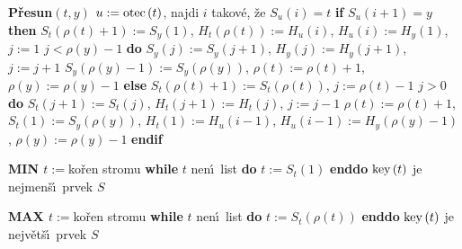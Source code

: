{\bf P\v resun$\left(t,y\right)$\newline 
$u:=\operatorname{otec}\left(t\right)$}, najdi $i$ takov\'e, \v ze $S_u\left(i\right)=t$\newline 
{\bf if} $S_u\left(i+1\right)=y$ {\bf then}\newline 
\phantom{---}$S_t\left(\rho \left(t\right)+1\right):=S_y\left(1\right)$, $H_t\left(\rho \left(t\right)\right):=H_u\left(i\right)$,\newline 
\phantom{---}$H_u\left(i\right):=H_y\left(1\right)$, $j:=1$\newline 
\phantom{---}{\bf while} $j<\rho \left(y\right)-1$ {\bf do}\newline 
\phantom{------}$S_y\left(j\right):=S_y\left(j+1\right)$, $H_y\left(j\right):=H_y\left(j+1\right)$, $j:=j+1$\newline 
\phantom{---}{\bf enddo}\newline 
\phantom{---}$S_y\left(\rho \left(y\right)-1\right):=S_y\left(\rho \left(y\right)\right)$, $\rho \left(t\right):=\rho \left(t\right)+1$, $\rho 
\left(y\right):=\rho \left(y\right)-1$\newline 
{\bf else}\newline
\phantom{---}$S_t\left(\rho \left(t\right)+1\right):=S_t\left(\rho \left(t\right)\right)$, $j:=\rho \left(t\right)-1$\newline 
\phantom{---}{\bf while} $j>0$ {\bf do}\newline 
\phantom{------}$S_t\left(j+1\right):=S_t\left(j\right)$, $H_t\left(j+1\right):=H_t\left(j\right)$, $j:=j-1$\newline 
\phantom{---}{\bf enddo}\newline 
\phantom{---}$\rho \left(t\right):=\rho \left(t\right)+1$, $S_t\left(1\right):=S_y\left(\rho \left(y\right)\right)$, $H_t\left(1\right):=H_u\left(i-
1\right)$,\newline 
\phantom{---}$H_u\left(i-1\right):=H_y\left(\rho \left(y\right)-1\right)$, $\rho \left(y\right):=\rho \left(y\right)-1$\newline 
{\bf endif}
\medskip

{\bf MIN\newline 
$t:=$}ko\v ren stromu\newline 
{\bf while} $t$ nen\'\i\ list {\bf do} $t:=S_t\left(1\right)$ {\bf enddo}\newline 
$\operatorname{key}\left(t\right)$ je nejmen\v s\'\i\ prvek $S$
\medskip

{\bf MAX\newline 
$t:=$}ko\v ren stromu\newline 
{\bf while} $t$ nen\'\i\ list {\bf do} $t:=S_t\left(\rho \left(t\right)\right)$ {\bf enddo}\newline 
$\operatorname{key}\left(t\right)$ je nejv\v et\v s\'\i\ prvek $S$
\medskip

